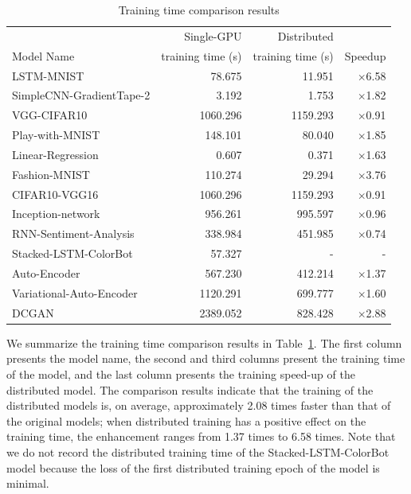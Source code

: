 \begin{table}
  \centering
  \caption{Training time comparison results}
  \label{fig:eval:traintime}
  \begin{tabular}{|l|r|r|r|}
\hline
                         & Single-GPU         & Distributed       & \\
Model Name               &  training time (s) & training time (s) &  Speedup\\
\hline
LSTM-MNIST               & 78.675& 11.951& $\times$6.58\\
SimpleCNN-GradientTape-2 & 3.192& 1.753& $\times$1.82\\
VGG-CIFAR10              & 1060.296  & 1159.293  &$\times$0.91   \\
Play-with-MNIST          & 148.101& 80.040& $\times$1.85\\
Linear-Regression        & 0.607& 0.371& $\times$1.63\\
Fashion-MNIST            & 110.274& 29.294& $\times$3.76\\
CIFAR10-VGG16            & 1060.296& 1159.293& $\times$0.91\\
Inception-network        & 956.261& 995.597& $\times$0.96\\
RNN-Sentiment-Analysis   & 338.984& 451.985& $\times$0.74\\
Stacked-LSTM-ColorBot    & 57.327 & -           & -   \\
Auto-Encoder             & 567.230& 412.214& $\times$1.37\\
Variational-Auto-Encoder & 1120.291& 699.777& $\times$1.60\\
DCGAN                    & 2389.052& 828.428& $\times$2.88\\ 
\hline
  \end{tabular}
\end{table}

We summarize the training time comparison results in
Table~\ref{fig:eval:traintime}.
The first column presents the model name, the second and third columns
present the training time of the model, and the last column presents the
training speed-up of the distributed model.
The comparison results indicate that the training of the distributed
models is, on average, approximately 2.08 times faster than that of the
original models; when distributed training has a positive effect on the
training time, the enhancement ranges from 1.37 times to 6.58 times.
Note that we do not record the distributed training time of the
Stacked-LSTM-ColorBot model because the loss of the first distributed training
epoch of the model is minimal.

